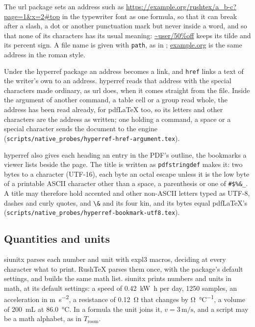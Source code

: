 \documentclass{article}
\numberwithin{equation}{section}
\theoremstyle{definition}
\theoremstyle{remark}
\begin{document}
The url package sets an address such as \url{https://example.org/rushtex/a_b-c?page=1&x=2#top}
in the typewriter font as one formula, so that it can break after a slash, a dot or
another punctuation mark but never inside a word, and so that none of its characters has
its usual meaning: \url{~user/50%off} keeps its tilde and its percent sign. A file name
is given with \texttt{path}, as in ; \url{example.org}
is the same address in the roman style.

Under the hyperref package an address becomes a link, and \texttt{href} links a text of
the writer's own to an address. hyperref reads that address with the special characters
made ordinary, as url does, when it comes straight from the file. Inside the argument of
another command, a table cell or a group read whole, the address has been read already,
for pdfLaTeX too, so its letters and other characters are the address as written; one
holding a command, a space or a special character sends the document to the engine
(\texttt{scripts/native\_probes/hyperref-href-argument.tex}).

hyperref also gives each heading an entry in the PDF's outline, the bookmarks a viewer
lists beside the page. The title is written as \texttt{pdfstringdef} makes it: two bytes
to a character (UTF-16), each byte an octal escape unless it is the low byte of a printable
ASCII character other than a space, a parenthesis or one of \texttt{\#\$\%\&\_}. A title may
therefore hold accented and other non-ASCII letters typed as UTF-8, dashes and curly
quotes, and \texttt{\textbackslash\&} and its four kin, and its bytes
equal pdfLaTeX's (\texttt{scripts/native\_probes/hyperref-bookmark-utf8.tex}).

\subsection{Quantities and units}\label{sec:units}
siunitx parses each number and unit with expl3 macros, deciding at every character what
to print. RushTeX parses them once, with the package's default settings, and builds the
same math list.
siunitx prints numbers and units in math, at its default settings: a speed of
\SI{0.42}{\kilo\watt\hour} per day, \num{1250} samples, an acceleration in
\si{\meter\per\second\squared}, a resistance of \SI{0.12}{\ohm} that changes by
\si{\ohm\per\degreeCelsius}, a volume of \SI{200}{mL} at \SI{86.0}{\celsius}. In a
formula the unit joins it, $v = 3\,\si{\meter\per\second}$, and a script may be a math
alphabet, as in $T_\mathrm{room}$.
\end{document}
